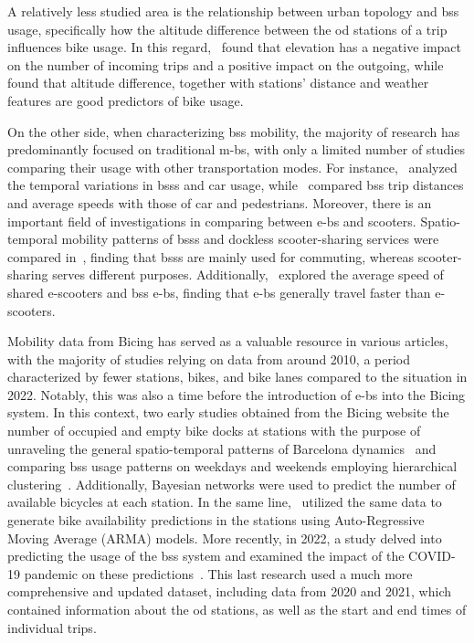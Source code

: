 A relatively less studied area is the relationship between urban topology and \ac{bss} usage, specifically how the altitude difference between the \ac{od} stations of a trip influences bike usage. In this regard,~\cite{Morency2015} found that elevation has a negative impact on the number of incoming trips and a positive impact on the outgoing, while~\cite{Kim2020} found that altitude difference, together with stations' distance and weather features are good predictors of bike usage.

On the other side, when characterizing \ac{bss} mobility, the majority of research has predominantly focused on traditional \acp{m-b}, with only a limited number of studies comparing their usage with other transportation modes. For instance,~\cite{Noussan2019} analyzed the temporal variations in \acp{bss} and car usage, while~\cite{Jensen2010} compared \ac{bss} trip distances and average speeds with those of car and pedestrians. Moreover, there is an important field of investigations in comparing between \acp{e-b} and scooters. Spatio-temporal mobility patterns of \acp{bss} and dockless scooter-sharing services were compared in~\cite{Mckenzie2019}, finding that \acp{bss} are mainly used for commuting, whereas scooter-sharing serves different purposes. Additionally,~\cite{Almannaa2020} explored the average speed of shared e-scooters and \ac{bss} \acp{e-b}, finding that \acp{e-b} generally travel faster than e-scooters.

Mobility data from Bicing has served as a valuable resource in various articles, with the majority of studies relying on data from around 2010, a period characterized by fewer stations, bikes, and bike lanes compared to the situation in 2022. Notably, this was also a time before the introduction of \acp{e-b} into the Bicing system. In this context, two early studies obtained from the Bicing website the number of occupied and empty bike docks at stations with the purpose of unraveling the general spatio-temporal patterns of Barcelona dynamics~\cite{Froehlich2008} and comparing \ac{bss} usage patterns on weekdays and weekends employing hierarchical clustering~\cite{Froehlich2009}. Additionally, Bayesian networks were used to predict the number of available bicycles at each station. In the same line,~\cite{Kaltenbrunner2010} utilized the same data to generate bike availability predictions in the stations using Auto-Regressive Moving Average (ARMA) models. More recently, in 2022, a study delved into predicting the usage of the \ac{bss} system and examined the impact of the COVID-19 pandemic on these predictions~\cite{Bustamante2022}. This last research used a much more comprehensive and updated dataset, including data from 2020 and 2021, which contained information about the \ac{od} stations, as well as the start and end times of individual trips.

